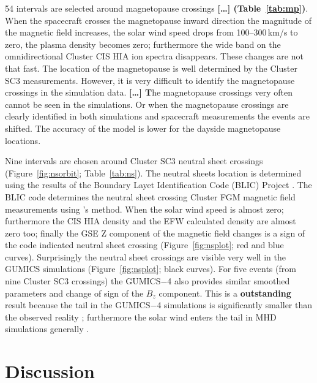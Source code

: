 \documentclass[linenumbers,draft]{agujournal}
\begin{document}
54 intervals are selected around magnetopause crossings \textbf{[\dots] (Table~\ref{tab:mp})}. When the spacecraft crosses the magnetopause inward direction the magnitude of the magnetic field increases, the solar wind speed drops from 100--300\,km/s to zero, the plasma density becomes zero; furthermore the wide band on the omnidirectional Cluster CIS HIA ion spectra disappears. These changes are not that fast. The location of the magnetopause is well determined by the Cluster SC3 measurements. However, it is very difficult to identify the magnetopause crossings in the simulation data. \textbf{[\dots] T}he magnetopause crossings very often cannot be seen in the simulations. Or when the magnetopause crossings are clearly identified in both simulations and spacecraft measurements the events are shifted. The accuracy of the model is lower for the dayside magnetopause locations. 

Nine intervals are chosen around Cluster SC3 neutral sheet crossings (Figure~\ref{fig:nsorbit}; Table~\ref{tab:ns}). The neutral sheets location is determined using the results of the Boundary Layet Identification Code (BLIC) Project \citep{facskoon:_bow_clust}. The BLIC code determines the neutral sheet crossing Cluster FGM magnetic field measurements using \citet{wang94:_signat}'s method. When the solar wind speed is almost zero; furthermore the CIS HIA density and the EFW calculated density are almost zero too; finally the GSE Z component of the magnetic field changes is a sign of the code indicated neutral sheet crossing (Figure~\ref{fig:nsplot}; red and blue curves). Surprisingly the neutral sheet crossings are visible very well in the GUMICS simulations (Figure~\ref{fig:nsplot}; black curves). For five events (from nine Cluster SC3 crossings) the GUMICS$-$4 also provides similar smoothed parameters and change of sign of the $B_{z}$ component. This is a \textbf{outstanding} result because the tail in the GUMICS$-$4 simulations is significantly smaller than the observed reality \citep{gordeev13:_verif_gumic_mhd,facsko16:_one_earth}; furthermore the solar wind enters the tail in MHD simulations generally \citep{kallio15:_proper}.

\section{Discussion}
\label{sec:discussion}
\end{document}
